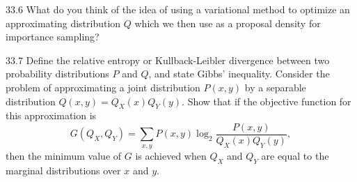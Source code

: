 \documentclass[12pt, a4paper]{article}
\begin{document}
\begin{prob}{33.6}
What do you think of the idea of using a variational method to optimize an approximating distribution $Q$ which we then use as a proposal density for importance sampling?
\end{prob}
\begin{sol}
\end{sol}
\bigskip

\begin{prob}{33.7}
Define the relative entropy or Kullback-Leibler divergence between two probability distributions $P$ and $Q$, and state Gibbs’ inequality. Consider the problem of approximating a joint distribution $P(x,y)$ by a separable distribution $Q(x,y) = Q_X(x)Q_Y(y)$. Show that if the objective function for this approximation is
\[
G(Q_X,Q_Y) = \sum_{x,y} P(x,y)\log_2\frac{P(x,y)}{Q_X(x)Q_Y(y)},
\]
then the minimum value of $G$ is achieved when $Q_X$ and $Q_Y$ are equal to the marginal distributions over $x$ and $y$.
\end{prob}
\begin{sol}
\end{sol}
\bigskip
\end{document}
